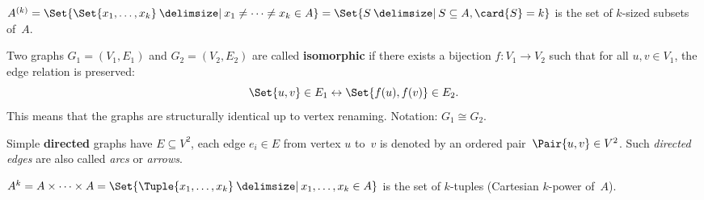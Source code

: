 \documentclass[a4paper,10pt]{article}
\begin{document}
\begin{terms}
    \begin{terms}
        \item $A^{(k)} = \Set{\Set{x_1,\dotsc,x_k} \given x_1 \neq \dotsb \neq x_k \in A} = \Set{ S \given S \subseteq A, \card{S} = k }$ is the set of $k$-sized subsets of~$A$.
    \end{terms}

    \item Two graphs $G_1 = (V_1, E_1)$ and $G_2 = (V_2, E_2)$ are called \textbf{isomorphic} if there exists a bijection $f: V_1 \to V_2$ such that for all $u, v \in V_1$, the edge relation is preserved:
    \[
    \Set{u, v} \in E_1 \iff \Set{f(u), f(v)} \in E_2.
    \]
    This means that the graphs are structurally identical up to vertex renaming.
    Notation: $G_1 \cong G_2$.

    \item Simple \textbf{directed} graphs have $E \subseteq V^{2}$, \ie each edge $e_i \in E$ from vertex $u$ to~$v$ is denoted by an ordered pair~$\Pair{u,v} \in V^{2}$.
    Such \emph{directed edges} are also called \emph{arcs} or \emph{arrows}.

    \begin{terms}
        \item $A^k = A \times \dotsb \times A = \Set{\Tuple{x_1,\dotsc,x_k} \given x_1,\dotsc,x_k \in A}$ is the set of $k$-tuples (Cartesian $k$-power of~$A$).
    \end{terms}

    \begin{minipage}{\linewidth}


\end{minipage}
\end{terms}
\end{document}
